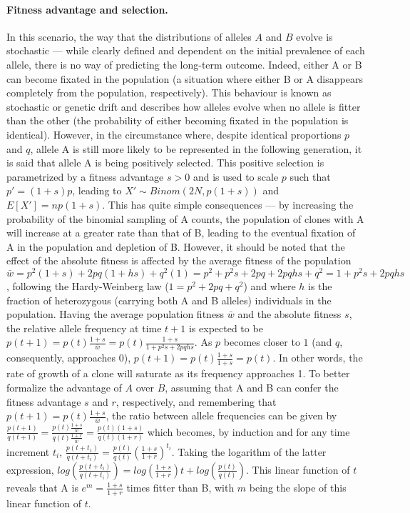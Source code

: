 \paragraph{Fitness advantage and selection.} In this scenario, the way that the distributions of alleles $A$ and $B$ evolve is stochastic --- while clearly defined and dependent on the initial prevalence of each allele, there is no way of predicting the long-term outcome. Indeed, either A or B can become fixated in the population (a situation where either B or A disappears completely from the population, respectively). This behaviour is known as stochastic or genetic drift and describes how alleles evolve when no allele is fitter than the other (the probability of either becoming fixated in the population is identical). However, in the circumstance where, despite identical proportions $p$ and $q$, allele A is still more likely to be represented in the following generation, it is said that allele A is being positively selected. This positive selection is parametrized by a fitness advantage $s > 0$ and is used to scale $p$ such that $p' = (1+s)p$, leading to $X' \sim Binom(2N,p(1+s))$ and $E[X'] = np(1+s)$. This has quite simple consequences --- by increasing the probability of the binomial sampling of A counts, the population of clones with A will increase at a greater rate than that of B, leading to the eventual fixation of A in the population and depletion of B. However, it should be noted that the effect of the absolute fitness is affected by the average fitness of the population $\bar{w} = p^2(1+s) + 2pq(1+hs) + q^2(1) = p^2 + p^2s + 2pq + 2pqhs + q^2 = 1 + p^2s + 2pqhs$, following the Hardy-Weinberg law ($1 = p^2 + 2pq + q^2$) and where $h$ is the fraction of heterozygous (carrying both A and B alleles) individuals in the population. Having the average population fitness $\bar{w}$ and the absolute fitness $s$, the relative allele frequency at time $t+1$ is expected to be $p(t+1) = p(t)\frac{1+s}{\bar{w}} = p(t)\frac{1+s}{1 + p^2s + 2pqhs}$. As $p$ becomes closer to $1$ (and $q$, consequently, approaches $0$), $p(t+1) = p(t)\frac{1+s}{1+s} = p(t)$. In other words, the rate of growth of a clone will saturate as its frequency approaches 1. To better formalize the advantage of $A$ over $B$, assuming that A and B can confer the fitness advantage $s$ and $r$, respectively, and remembering that $p(t+1) = p(t)\frac{1+s}{\bar{w}}$, the ratio between allele frequencies can be given by $\frac{p(t+1)}{q(t+1)} = \frac{p(t)\frac{1+s}{\bar{w}}}{q(t)\frac{1+r}{\bar{w}}} = \frac{p(t)(1+s)}{q(t)(1+r)}$ which becomes, by induction and for any time increment $t_i$, $\frac{p(t+t_1)}{q(t+t_i)}=\frac{p(t)}{q(t)}(\frac{1+s}{1+r})^{t_i}$. Taking the logarithm of the latter expression, $log(\frac{p(t+t_i)}{q(t+t_i)}) = log(\frac{1+s}{1+r})t + log(\frac{p(t)}{q(t)})$. This linear function of $t$ reveals that A is $e^{m} = \frac{1+s}{1+r}$ times fitter than B, with $m$ being the slope of this linear function of $t$. 


